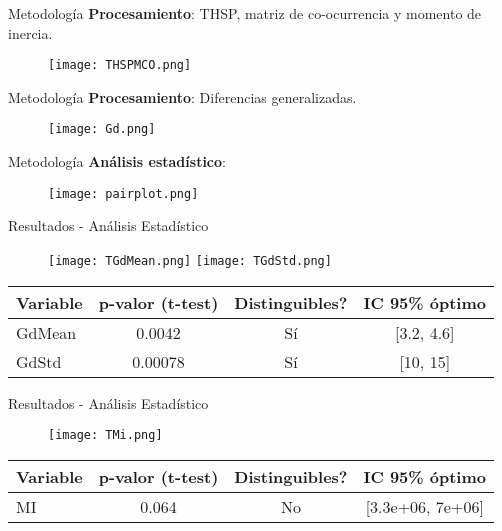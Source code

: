 \documentclass{beamer}
\begin{document}
\begin{frame}{Metodología}
    \textbf{Procesamiento}: THSP, matriz de co-ocurrencia y momento de inercia.
    \begin{figure}
        \texttt{[image: THSPMCO.png]}
    \end{figure}
\end{frame}

\begin{frame}{Metodología}
    \textbf{Procesamiento}: Diferencias generalizadas.
    \begin{figure}
        \texttt{[image: Gd.png]}
    \end{figure}

\end{frame}

\begin{frame}{Metodología}
    \textbf{Análisis estadístico}: 
    \begin{figure}
        \texttt{[image: pairplot.png]}
    \end{figure}

\end{frame}

\begin{frame}{Resultados - Análisis Estadístico}
    \begin{table}
        \centering
        \begin{figure}
            \texttt{[image: TGdMean.png]}
            \texttt{[image: TGdStd.png]}
        \end{figure}
        \begin{tabular}{|l|c|c|c|}
            \hline
            \textbf{Variable} & \textbf{p-valor (t-test)} & \textbf{Distinguibles?} & \textbf{IC 95\% óptimo} \\
            \hline
            GdMean & 0.0042 & Sí & [3.2, 4.6] \\
            GdStd & 0.00078 & Sí & [10, 15] \\
            \hline
        \end{tabular}
    \end{table}
\end{frame}

\begin{frame}{Resultados - Análisis Estadístico}
    \begin{table}
        \centering
        \begin{figure}
            \texttt{[image: TMi.png]}
        \end{figure}
        \begin{tabular}{|l|c|c|c|}
            \hline
            \textbf{Variable} & \textbf{p-valor (t-test)} & \textbf{Distinguibles?} & \textbf{IC 95\% óptimo} \\
            \hline
            MI & 0.064 & No & [3.3e+06, 7e+06] \\
            \hline
        \end{tabular}
    \end{table}
\end{frame}
\end{document}
